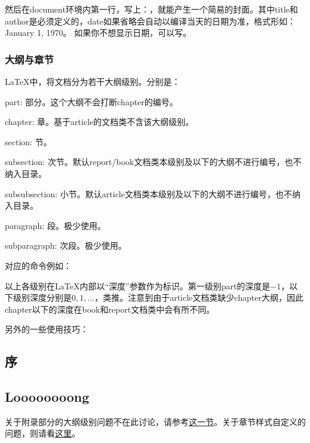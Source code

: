 {然后在document环境内第一行，写上：\latexline{\\maketitle}，就能产生一个简易的封面。其中title和author是必须定义的，date如果省略会自动以编译当天的日期为准，格式形如：January 1, 1970。 如果你不想显示日期，可以写\latexline{\\date{}}。

\subsection{大纲与章节}
\LaTeX 中，将文档分为若干大纲级别。分别是：
\begin{para}
\item[\char92{}part:] 部分。这个大纲不会打断chapter的编号。
\item[\char92{}chapter:] 章。基于article的文档类不含该大纲级别。
\item[\char92{}section:] 节。
\item[\char92{}subsection:] 次节。默认report/book文档类本级别及以下的大纲不进行编号，也不纳入目录。
\item[\char92{}subsubsection:] 小节。默认article文档类本级别及以下的大纲不进行编号，也不纳入目录。
\item[\char92{}paragraph:] 段。极少使用。
\item[\char92{}subparagraph:] 次段。极少使用。
\end{para}

对应的命令例如：

以上各级别在\LaTeX 内部以“深度”参数作为标识。第一级别part的深度是$-1$，以下级别深度分别是$0,1,\ldots$，类推。注意到由于article文档类缺少chapter大纲，因此chapter以下的深度在book和report文档类中会有所不同。\dpar

另外的一些使用技巧：
\begin{latex}{}
\setcounter{tocdepth}{2}
\chapter*{序}
\section[Short]{Loooooooong}
\end{latex}

关于附录部分的大纲级别问题不在此讨论，请参考\hyperref[sec:appendix]{这一节}。关于章节样式自定义的问题，则请看\hyperref[sec:titlesec]{这里}。

}
